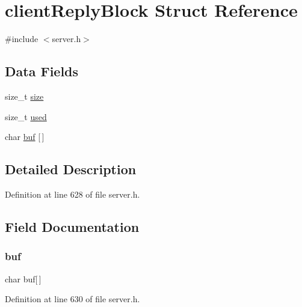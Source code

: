 \hypertarget{structclient_reply_block}{}\section{client\+Reply\+Block Struct Reference}
\label{structclient_reply_block}


{\ttfamily \#include $<$server.\+h$>$}

\subsection*{Data Fields}
\begin{DoxyCompactItemize}
\item 
size\+\_\+t \hyperlink{structclient_reply_block_a854352f53b148adc24983a58a1866d66}{size}
\item 
size\+\_\+t \hyperlink{structclient_reply_block_ae8cc011bf3ee2d3c19743095ffc0f7a5}{used}
\item 
char \hyperlink{structclient_reply_block_a781718f5b53a876fe91c424c4607fa8f}{buf} \mbox{[}$\,$\mbox{]}
\end{DoxyCompactItemize}


\subsection{Detailed Description}


Definition at line 628 of file server.\+h.



\subsection{Field Documentation}
\mbox{\label{structclient_reply_block_a781718f5b53a876fe91c424c4607fa8f}} 
\subsubsection{\texorpdfstring{buf}{buf}}
{\footnotesize\ttfamily char buf\mbox{[}$\,$\mbox{]}}



Definition at line 630 of file server.\+h.

\mbox{\label{structclient_reply_block_a854352f53b148adc24983a58a1866d66}} 
